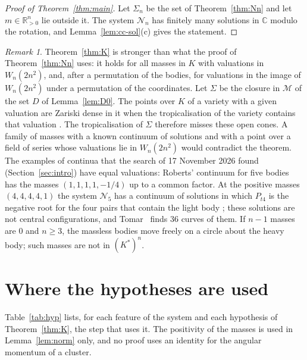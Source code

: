 \documentclass[11pt]{amsart}
\theoremstyle{definition}
\theoremstyle{remark}
\newtheorem{remark}[theorem]{Remark}
\numberwithin{equation}{section}
\newcommand{\CC}{\mathbb{C}}
\newcommand{\RR}{\mathbb{R}}
\newcommand{\cN}{\mathcal{N}}
\newcommand{\cM}{\mathcal{M}}
\begin{document}
\begin{proof}[Proof of Theorem~\ref{thm:main}]
Let $\Sigma_n$ be the set of Theorem~\ref{thm:Nn} and let $m \in \RR_{>0}^n$ lie outside it. The system
$\cN_n$ has finitely many solutions in $\CC$ modulo the rotation, and Lemma~\ref{lem:cc-sol}(c) gives the
statement.
\end{proof}

\begin{remark}\label{rem:roberts}
Theorem~\ref{thm:K} is stronger than what the proof of Theorem~\ref{thm:Nn} uses: it holds for all masses
in $K$ with valuations in $W_n(2n^2)$, and, after a permutation of the bodies, for valuations in the
image of $W_n(2n^2)$ under a permutation of the coordinates. Let $\Sigma$ be the closure in $\cM$ of the set $D$ of Lemma~\ref{lem:D0}. The points over
$K$ of a variety with a given valuation are Zariski dense in it when the tropicalisation of the variety
contains that valuation \cite[Corollary~4.2 and the erratum]{payne2009}. The tropicalisation of
$\Sigma$ therefore misses these open cones. A family of masses with a known continuum of solutions and
with a point over a field of series whose valuations lie in $W_n(2n^2)$ would contradict the theorem.
The examples of continua that the search of 17 November 2026 found (Section~\ref{sec:intro}) have
equal valuations: Roberts' continuum for five
bodies~\cite{roberts1999} has the masses $(1, 1, 1, 1, -1/4)$ up to a common factor. At the positive
masses $(4, 4, 4, 4, 1)$ the system $\cN_5$ has a continuum of solutions in which $P_{t4}$ is the
negative root for the four pairs that contain the light body
\cite[p.~543 and Remark~8]{albouykaloshin2012}; these solutions are not central configurations, and
Tomar~\cite{tomarspecial} finds 36 curves of them. If $n - 1$ masses are $0$ and $n \ge 3$, the
massless bodies move freely on a circle about the heavy body; such masses are not in $(K^{*})^n$.
\end{remark}

\section{Where the hypotheses are used}\label{sec:hyp}

Table~\ref{tab:hyp} lists, for each feature of the system and each hypothesis of Theorem~\ref{thm:K}, the
step that uses it. The positivity of the masses is used in Lemma~\ref{lem:norm} only, and no proof uses an identity for the
angular momentum of a cluster.
\end{document}

